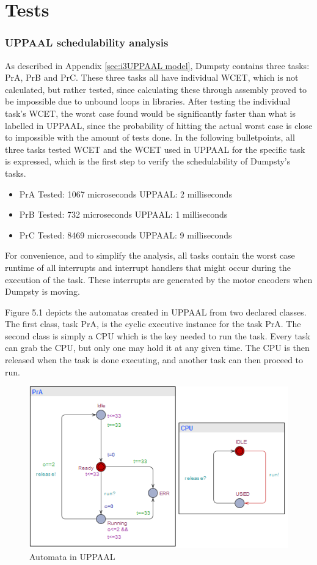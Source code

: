 \chapter{Tests}
\label{chap:Tests}

\subsection{UPPAAL schedulability analysis}
\label{sec:UPPAAL schedulability}
As described in Appendix \ref{sec:i3UPPAAL model}, Dumpsty contains three tasks: PrA, PrB and PrC. These three tasks all have individual WCET, which is not calculated, but rather tested, since calculating these through assembly proved to be impossible due to unbound loops in libraries. After testing the individual task's WCET, the worst case found would be significantly faster than what is labelled in UPPAAL, since the probability of hitting the actual worst case is close to impossible with the amount of tests done. In the following bulletpoints, all three tasks tested WCET and the WCET used in UPPAAL for the specific task is expressed, which is the first step to verify the schedulability of Dumpsty's tasks.

\begin{itemize}
	\item PrA \tab Tested: 1067 microseconds \tab UPPAAL: 2 milliseconds
	\item PrB \tab Tested: 732  microseconds \tab UPPAAL: 1 milliseconds
	\item PrC \tab	Tested: 8469 microseconds \tab UPPAAL: 9 milliseconds
\end{itemize}

For convenience, and to simplify the analysis, all tasks contain the worst case runtime of all interrupts and interrupt handlers that might occur during the execution of the task. These interrupts are generated by the motor encoders when Dumpsty is moving.

Figure 5.1 depicts the automatas created in UPPAAL from two declared classes. The first class, task PrA, is the cyclic executive instance for the task PrA. The second class is simply a CPU which is the key needed to run the task. Every task can grab the CPU, but only one may hold it at any given time. The CPU is then released when the task is done executing, and another task can then proceed to run.

\begin{figure}[h]
	\centering
	\includegraphics[scale=1]{billeder/UPPAALPr}
	\caption{Automata in UPPAAL}
	\label{robot}
\end{figure}